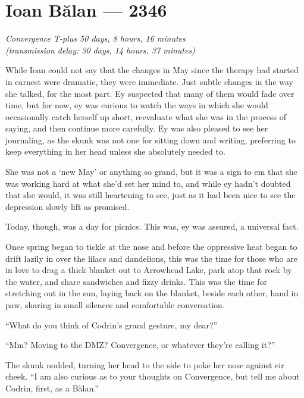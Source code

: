\hypertarget{ioan-bux103lan-2346}{%
\chapter{Ioan Bălan — 2346}}

\begin{center}
\emph{Convergence T-plus 50 days, 8 hours, 16 minutes}\\
\emph{(transmission delay: 30 days, 14 hours, 37 minutes)}
\end{center}

\noindent While Ioan could not say that the changes in May since the therapy had started in earnest were dramatic, they were immediate. Just subtle changes in the way she talked, for the most part. Ey suspected that many of them would fade over time, but for now, ey was curious to watch the ways in which she would occasionally catch herself up short, reevaluate what she was in the process of saying, and then continue more carefully. Ey was also pleased to see her journaling, as the skunk was not one for sitting down and writing, preferring to keep everything in her head unless she absolutely needed to.

She was not a `new May' or anything so grand, but it was a sign to em that she was working hard at what she'd set her mind to, and while ey hadn't doubted that she would, it was still heartening to see, just as it had been nice to see the depression slowly lift as promised.

Today, though, was a day for picnics. This was, ey was assured, a universal fact.

Once spring began to tickle at the nose and before the oppressive heat began to drift lazily in over the lilacs and dandelions, this was the time for those who are in love to drag a thick blanket out to Arrowhead Lake, park atop that rock by the water, and share sandwiches and fizzy drinks. This was the time for stretching out in the sun, laying back on the blanket, beside each other, hand in paw, sharing in small silences and comfortable conversation.

``What do you think of Codrin's grand gesture, my dear?''

``Mm? Moving to the DMZ? Convergence, or whatever they're calling it?''

The skunk nodded, turning her head to the side to poke her nose against eir cheek. ``I am also curious as to your thoughts on Convergence, but tell me about Codrin, first, as a Bălan.''

